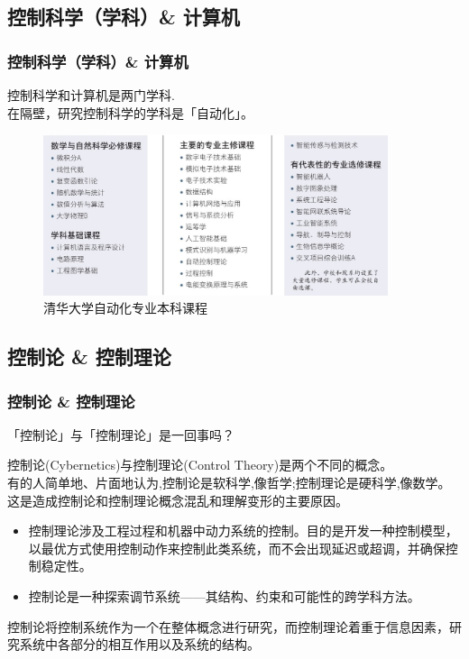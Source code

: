 \documentclass[12pt,AutoFakeBold,aspectratio=43,mathserif]{beamer}
\begin{document}
    \subsection{控制科学（学科）\& 计算机}
    \begin{frame}
        \frametitle{控制科学（学科）\& 计算机}
        \pause
        控制科学和计算机是两门学科. \\
        在隔壁，研究控制科学的学科是「自动化」。
        \begin{figure}[htbp]
            \caption{清华大学自动化专业本科课程}
            \setlength{\abovecaptionskip}{0.cm}
            \setlength{\belowcaptionskip}{-0.cm}
            \centering
            \vspace{-0.3cm}
            \setlength{\abovecaptionskip}{0.cm}
            \setlength{\belowcaptionskip}{-0.cm}
            \includegraphics[width=0.9\textwidth]{figures/3-1.jpg}
        \end{figure}
    \end{frame}
    \subsection{控制论 \& 控制理论}
    \begin{frame}
        \frametitle{控制论 \& 控制理论}
        \begin{block}{\textnormal{「控制论」与「控制理论」是一回事吗？}}
        \end{block} \pause
        \footnotesize
        控制论(Cybernetics)与控制理论(Control Theory)是两个不同的概念。 \\
        有的人简单地、片面地认为,控制论是软科学,像哲学;控制理论是硬科学,像数学。这是造成控制论和控制理论概念混乱和理解变形的主要原因。 \\
        \begin{itemize}
            \item 控制理论涉及工程过程和机器中动力系统的控制。目的是开发一种控制模型，以最优方式使用控制动作来控制此类系统，而不会出现延迟或超调，并确保控制稳定性。\pause
            \item 控制论是一种探索调节系统——其结构、约束和可能性的跨学科方法。\pause
        \end{itemize}
        控制论将控制系统作为一个在整体概念进行研究，而控制理论着重于信息因素，研究系统中各部分的相互作用以及系统的结构。
        \pause
        
    
    \end{frame}
\end{document}
